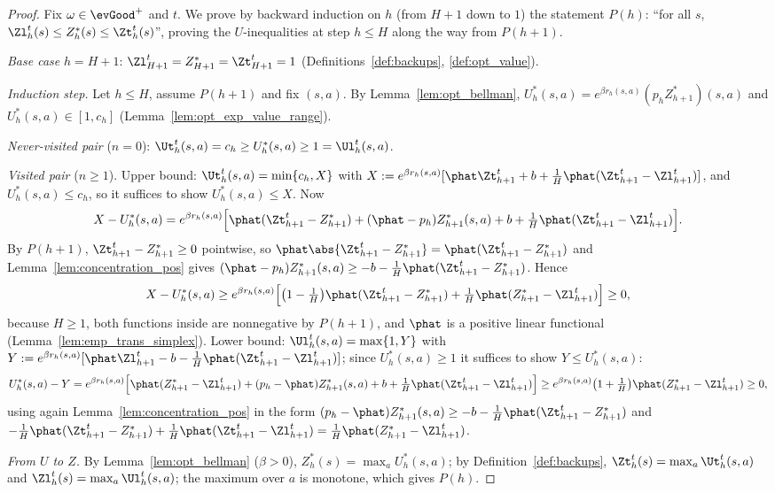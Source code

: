 \begin{proof}
\leanok
Fix $\omega \in \evGood^+$ and $t$. We prove by backward induction on $h$ (from $H + 1$ down to
$1$) the statement $P(h)$: ``for all $s$, $\Zl_h^t(s) \le Z^*_h(s) \le \Zt_h^t(s)$'', proving the
$U$-inequalities at step $h \le H$ along the way from $P(h+1)$.

\emph{Base case} $h = H + 1$: $\Zl_{H+1}^t = Z^*_{H+1} = \Zt_{H+1}^t = 1$
(Definitions~\ref{def:backups}, \ref{def:opt_value}).

\emph{Induction step.} Let $h \le H$, assume $P(h+1)$ and fix $(s,a)$. By
Lemma~\ref{lem:opt_bellman}, $U^*_h(s,a) = e^{\beta r_h(s,a)} (p_h Z^*_{h+1})(s,a)$ and
$U^*_h(s,a) \in [1, c_h]$ (Lemma~\ref{lem:opt_exp_value_range}).

\emph{Never-visited pair} ($n = 0$): $\Ut_h^t(s,a) = c_h \ge U^*_h(s,a) \ge 1 = \Ul_h^t(s,a)$.

\emph{Visited pair} ($n \ge 1$). Upper bound: $\Ut_h^t(s,a) = \min\{c_h, X\}$ with
$X := e^{\beta r_h(s,a)}[\phat\Zt^t_{h+1} + b + \frac1H\phat(\Zt^t_{h+1} - \Zl^t_{h+1})]$, and
$U^*_h(s,a) \le c_h$, so it suffices to show $U^*_h(s,a) \le X$. Now
\[
  X - U^*_h(s,a) = e^{\beta r_h(s,a)}\Big[ \phat(\Zt^t_{h+1} - Z^*_{h+1}) + (\phat - p_h)Z^*_{h+1}(s,a)
  + b + \tfrac1H \phat(\Zt^t_{h+1} - \Zl^t_{h+1}) \Big].
\]
By $P(h+1)$, $\Zt^t_{h+1} - Z^*_{h+1} \ge 0$ pointwise, so
$\phat\abs{\Zt^t_{h+1} - Z^*_{h+1}} = \phat(\Zt^t_{h+1} - Z^*_{h+1})$ and
Lemma~\ref{lem:concentration_pos} gives
$(\phat - p_h)Z^*_{h+1}(s,a) \ge -b - \frac1H\phat(\Zt^t_{h+1} - Z^*_{h+1})$. Hence
\[
  X - U^*_h(s,a) \ge e^{\beta r_h(s,a)}\Big[\big(1 - \tfrac1H\big)\phat(\Zt^t_{h+1} - Z^*_{h+1})
  + \tfrac1H \phat(Z^*_{h+1} - \Zl^t_{h+1})\Big] \ge 0 ,
\]
because $H \ge 1$, both functions inside are nonnegative by $P(h+1)$, and $\phat$ is a
positive linear functional (Lemma~\ref{lem:emp_trans_simplex}). Lower bound:
$\Ul_h^t(s,a) = \max\{1, Y\}$ with
$Y := e^{\beta r_h(s,a)}[\phat\Zl^t_{h+1} - b - \frac1H\phat(\Zt^t_{h+1} - \Zl^t_{h+1})]$; since
$U^*_h(s,a) \ge 1$ it suffices to show $Y \le U^*_h(s,a)$:
\[
  U^*_h(s,a) - Y = e^{\beta r_h(s,a)}\Big[\phat(Z^*_{h+1} - \Zl^t_{h+1}) + (p_h - \phat)Z^*_{h+1}(s,a)
  + b + \tfrac1H\phat(\Zt^t_{h+1} - \Zl^t_{h+1})\Big]
  \ge e^{\beta r_h(s,a)}\big(1 + \tfrac1H\big)\phat(Z^*_{h+1} - \Zl^t_{h+1}) \ge 0,
\]
using again Lemma~\ref{lem:concentration_pos} in the form
$(p_h - \phat)Z^*_{h+1}(s,a) \ge -b - \frac1H\phat(\Zt^t_{h+1} - Z^*_{h+1})$ and
$-\frac1H\phat(\Zt^t_{h+1} - Z^*_{h+1}) + \frac1H\phat(\Zt^t_{h+1} - \Zl^t_{h+1}) = \frac1H\phat(Z^*_{h+1} - \Zl^t_{h+1})$.

\emph{From $U$ to $Z$.} By Lemma~\ref{lem:opt_bellman} ($\beta > 0$), $Z^*_h(s) = \max_a U^*_h(s,a)$;
by Definition~\ref{def:backups}, $\Zt_h^t(s) = \max_a\Ut_h^t(s,a)$ and $\Zl_h^t(s) = \max_a \Ul_h^t(s,a)$;
the maximum over $a$ is monotone, which gives $P(h)$.
\end{proof}

